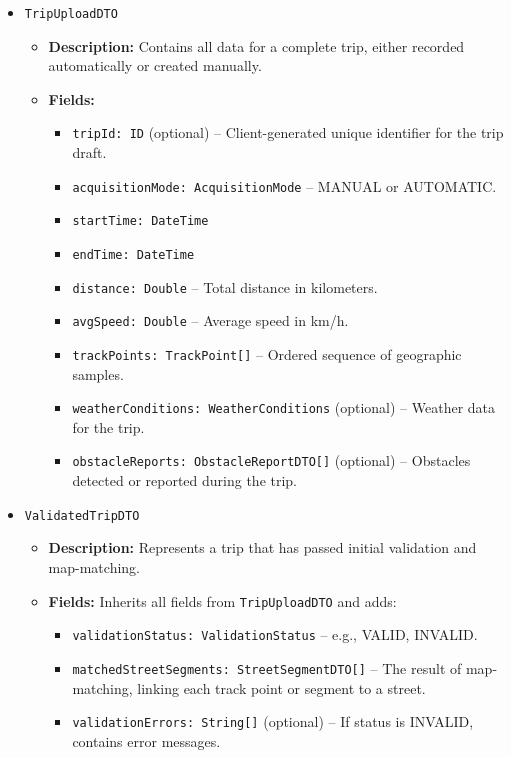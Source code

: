 \begin{itemize}
    \item \texttt{TripUploadDTO}
    \begin{itemize}
        \item \textbf{Description:} Contains all data for a complete trip, either recorded automatically or created manually.
        \item \textbf{Fields:}
        \begin{itemize}
            \item \texttt{tripId: ID} (optional) – Client-generated unique identifier for the trip draft.
            \item \texttt{acquisitionMode: AcquisitionMode} – MANUAL or AUTOMATIC.
            \item \texttt{startTime: DateTime}
            \item \texttt{endTime: DateTime}
            \item \texttt{distance: Double} – Total distance in kilometers.
            \item \texttt{avgSpeed: Double} – Average speed in km/h.
            \item \texttt{trackPoints: TrackPoint[]} – Ordered sequence of geographic samples.
            \item \texttt{weatherConditions: WeatherConditions} (optional) – Weather data for the trip.
            \item \texttt{obstacleReports: ObstacleReportDTO[]} (optional) – Obstacles detected or reported during the trip.
        \end{itemize}
    \end{itemize}

    \item \texttt{ValidatedTripDTO}
    \begin{itemize}
        \item \textbf{Description:} Represents a trip that has passed initial validation and map-matching.
        \item \textbf{Fields:} Inherits all fields from \texttt{TripUploadDTO} and adds:
        \begin{itemize}
            \item \texttt{validationStatus: ValidationStatus} – e.g., VALID, INVALID.
            \item \texttt{matchedStreetSegments: StreetSegmentDTO[]} – The result of map-matching, linking each track point or segment to a street.
            \item \texttt{validationErrors: String[]} (optional) – If status is INVALID, contains error messages.
        \end{itemize}
    \end{itemize}


\end{itemize}
